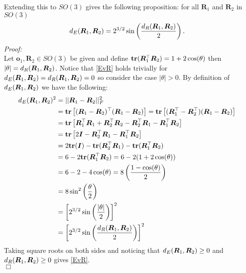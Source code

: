 Extending this to $SO(3)$ gives the following proposition: for all $\bm{R}_1$ and $\bm{R}_2$ in $SO(3)$
\begin{equation}\label{EvR}
{d_E} (\bm{R}_1,\bm{R}_2)=2^{3/2}\sin\left(\frac{{d_R}(\bm{R}_1,\bm{R}_2)}{2}\right).
\end{equation}
\emph{Proof:}\\
Let $\bm{o}_1,\bm{R}_2\in SO(3)$ be given and define ${\mathbf{tr}}(\bm R_1^\top\bm R_2)=1+2\cos(\theta)$ then $|\theta|={d_R}(\bm R_1,\bm R_2)$.  Notice that \eqref{EvR} holds trivially for ${d_E} (\bm R_1,\bm R_2)={d_R}(\bm R_1,\bm R_2)=0$ so consider the case $|\theta|>0$.  By definition of ${d_E} (\bm R_1,\bm R_2)$ we have the following:
\begin{align*}
{d_E} (\bm R_1,\bm R_2)^2
&=||\bm R_1-\bm R_2||_F^2\\
&={\mathbf{tr}}\left[(\bm R_1-\bm R_2)^\top(\bm R_1-\bm R_2)\right]={\mathbf{tr}}\left[(\bm R_1^\top-\bm R_2^\top)(\bm R_1-\bm R_2)\right]\\
&={\mathbf{tr}}\left[\bm R_1^\top\bm R_1+\bm R_2^\top\bm R_2-\bm R_2^\top\bm R_1-\bm R_1^\top\bm R_2\right]\\
&={\mathbf{tr}}\left[2\bm{I}-\bm R_2^\top\bm R_1-\bm R_1^\top\bm R_2\right]\\
&=2{\mathbf{tr}}(\bm{I})-{\mathbf{tr}}(\bm R_2^\top\bm R_1)-{\mathbf{tr}}(\bm R_1^\top\bm R_2)\\
&=6-2{\mathbf{tr}}(\bm R_1^\top\bm R_2)=6-2(1+2\cos(\theta))\\
&=6-2-4\cos(\theta)=8\left(\frac{1-\cos(\theta)}{2}\right)\\
&=8\sin^2\left(\frac{\theta}{2}\right)\\
&=\left[2^{3/2}\sin\left(\frac{|\theta|}{2}\right)\right]^2\\
&=\left[2^{3/2}\sin\left(\frac{{d_R}(\bm R_1,\bm R_2)}{2}\right)\right]^2
\end{align*}
Taking square roots on both sides and noticing that ${d_E} (\bm R_1,\bm R_2)\geq0$ and ${d_R} (\bm R_1,\bm R_2)\geq0$ gives \eqref{EvR}.\\
$\Box$
